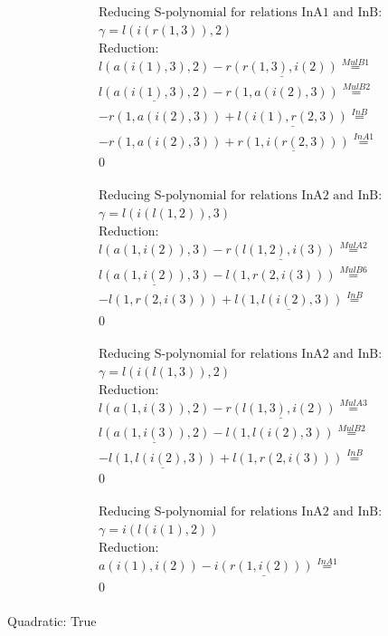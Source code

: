 \documentclass[11pt]{amsart}
\begin{document}
\begin{align*} 
& \text{Reducing S-polynomial for relations InA1 and InB:} \\ 
& \gamma = l(i(r(1,3)),2) \\ 
& \text{Reduction}: \\&l(a(i(1),3),2) - \underline{r(r(1,3),i(2))} \stackrel{ MulB1 }{=}  \\ 
&\underline{l(a(i(1),3),2)} - r(1,a(i(2),3)) \stackrel{ MulB2 }{=}  \\ 
& - r(1,a(i(2),3)) + \underline{l(i(1),r(2,3))} \stackrel{ InB }{=}  \\ 
& - r(1,a(i(2),3)) + \underline{r(1,i(r(2,3)))} \stackrel{ InA1 }{=}  \\ 
&0\\ 
\end{align*} 
 
\begin{align*} 
& \text{Reducing S-polynomial for relations InA2 and InB:} \\ 
& \gamma = l(i(l(1,2)),3) \\ 
& \text{Reduction}: \\&l(a(1,i(2)),3) - \underline{r(l(1,2),i(3))} \stackrel{ MulA2 }{=}  \\ 
&\underline{l(a(1,i(2)),3)} - l(1,r(2,i(3))) \stackrel{ MulB6 }{=}  \\ 
& - l(1,r(2,i(3))) + \underline{l(1,l(i(2),3))} \stackrel{ InB }{=}  \\ 
&0\\ 
\end{align*} 
 
\begin{align*} 
& \text{Reducing S-polynomial for relations InA2 and InB:} \\ 
& \gamma = l(i(l(1,3)),2) \\ 
& \text{Reduction}: \\&l(a(1,i(3)),2) - \underline{r(l(1,3),i(2))} \stackrel{ MulA3 }{=}  \\ 
&\underline{l(a(1,i(3)),2)} - l(1,l(i(2),3)) \stackrel{ MulB2 }{=}  \\ 
& - \underline{l(1,l(i(2),3))} + l(1,r(2,i(3))) \stackrel{ InB }{=}  \\ 
&0\\ 
\end{align*} 
 
\begin{align*} 
& \text{Reducing S-polynomial for relations InA2 and InB:} \\ 
& \gamma = i(l(i(1),2)) \\ 
& \text{Reduction}: \\&a(i(1),i(2)) - \underline{i(r(1,i(2)))} \stackrel{ InA1 }{=}  \\ 
&0\\ 
\end{align*} 
 

 Quadratic: True
 
\end{document}
